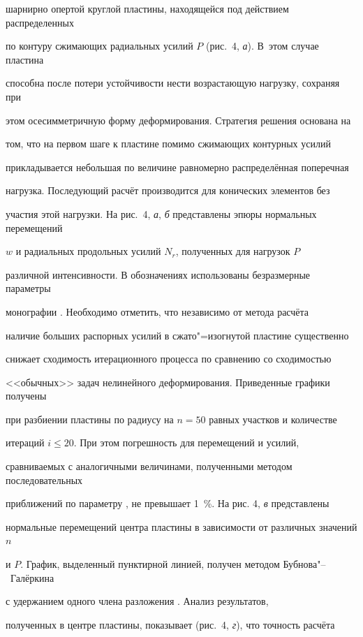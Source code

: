 шарнирно опертой круглой пластины, находящейся под действием распределенных

по контуру сжимающих радиальных усилий $P$ (рис.~4, {\sl а}). В~этом случае пластина

способна после потери устойчивости нести возрастающую нагрузку, сохраняя при

этом осесимметричную форму деформирования. Стратегия решения основана на

том, что на первом шаге к пластине помимо сжимающих контурных усилий

прикладывается небольшая по величине равномерно распределённая поперечная

нагрузка. Последующий расчёт производится для конических элементов без

участия этой нагрузки. На рис.~4, {\sl а}, {\sl б} представлены эпюры нормальных перемещений

$w$ и радиальных продольных усилий $N_r$, полученных для нагрузок $P$

различной интенсивности. В обозначениях использованы безразмерные параметры

монографии \cite{elen:bib2}. Необходимо отметить, что независимо от метода расчёта

наличие больших распорных усилий в сжато"=изогнутой пластине существенно

снижает сходимость итерационного процесса по сравнению со сходимостью

<<обычных>> задач нелинейного деформирования. Приведенные графики получены

при разбиении пластины по радиусу на $n=50$ равных участков и количестве

итераций $i\le 20$. При этом погрешность для перемещений и усилий,

сравниваемых с аналогичными величинами, полученными методом последовательных

приближений по параметру \cite{elen:bib2}, не превышает 1~{\%}. На рис. 4, {\sl в} представлены

нормальные перемещений центра пластины в зависимости от различных значений $n$

и $P$. График, выделенный пунктирной линией, получен методом Бубнова"--~Галёркина

с удержанием одного члена разложения \cite{elen:bib7,elen:bib8}. Анализ результатов,

полученных в центре пластины, показывает (рис.~4, {\sl г}), что точность расчёта

